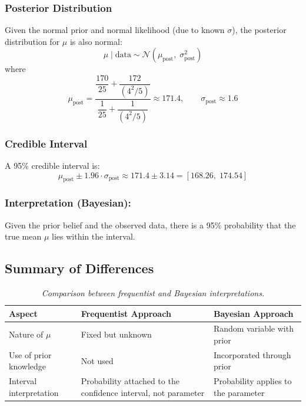 \documentclass[twoside]{book}
\begin{document}
\subsubsection*{Posterior Distribution}

Given the normal prior and normal likelihood (due to known $\sigma$), the posterior distribution for $\mu$ is also normal:
\[
\mu \mid \text{data} \sim \mathcal{N}(\mu_{\text{post}},\; \sigma^2_{\text{post}})
\]
where
\[
\mu_{\text{post}} = \dfrac{\dfrac{170}{25} + \dfrac{172}{(4^2/5)}}{\dfrac{1}{25} + \dfrac{1}{(4^2/5)}} \approx 171.4, \qquad
\sigma_{\text{post}} \approx 1.6
\]

\subsubsection*{Credible Interval}

A 95\% credible interval is:
\[
\mu_{\text{post}} \pm 1.96 \cdot \sigma_{\text{post}} \approx 171.4 \pm 3.14 = [168.26,\; 174.54]
\]

\subsubsection*{Interpretation (Bayesian):}

Given the prior belief and the observed data, there is a 95\% probability that the true mean $\mu$ lies within the interval.

\vspace{1em}

\subsection{Summary of Differences}

\begin{table}[H]
\centering
\begin{tabular}{p{3.5cm}|p{4.2cm}|p{4.2cm}}
\toprule
\textbf{Aspect} & \textbf{Frequentist Approach} & \textbf{Bayesian Approach} \\
\midrule
Nature of $\mu$ & Fixed but unknown & Random variable with prior \\
\midrule
Use of prior knowledge & Not used & Incorporated through prior \\
\midrule
Interval interpretation & Probability attached to the confidence interval, not parameter & Probability applies to the parameter \\
\bottomrule
\end{tabular}
\caption{\textit{Comparison between frequentist and Bayesian interpretations.}}
\end{table}
\end{document}
